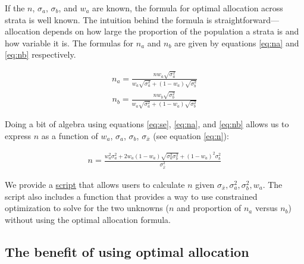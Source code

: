 \documentclass[12pt, letterpaper]{article}
\begin{document}
If the $n$, $\sigma_a$, $\sigma_b$, and $w_a$ are known, the formula for optimal allocation across strata is well known. The intuition behind the formula is straightforward---allocation depends on how large the proportion of the population a strata is and how variable it is. The formulas for $n_a$ and $n_b$ are given by equations \ref{eq:na} and \ref{eq:nb} respectively.

\begin{align}\label{eq:na}
n_a = \frac{n w_a \sqrt{\sigma_a^2}}{w_a \sqrt{\sigma_a^2} + (1 - w_a) \sqrt{\sigma_b^2}}
\end{align}
\begin{align}\label{eq:nb}
n_b = \frac{n w_b \sqrt{\sigma_b^2}}{w_a \sqrt{\sigma_a^2} + (1 - w_a) \sqrt{\sigma_b^2}}
\end{align}

Doing a bit of algebra using equations \ref{eq:se}, \ref{eq:na}, and \ref{eq:nb} allows us to express $n$ as a function of $w_a$, $\sigma_a$, $\sigma_b$, $\sigma_{\bar{x}}$ (see equation \ref{eq:n}):

\begin{align}\label{eq:n}
n  = \frac{w_a^2 \sigma_a^2 + 2 w_a (1 - w_a) \sqrt{\sigma_a^2 \sigma_b^2} + (1 - w_a)^2 \sigma_b^2}{\sigma_{\bar{x}}^2}
\end{align}\label{eq:n}

We provide a \href{https://github.com/soodoku/optimal\_data\_collection/blob/main/scripts/smallest\_n\_for\_se.R}{script} that allows users to calculate $n$ given $\sigma_{\bar{x}}, \sigma_a^2, \sigma_b^2, w_a$. The script also includes a function that provides a way to use constrained optimization to solve for the two unknowns ($n$ and proportion of $n_a$ versus $n_b$) without using the optimal allocation formula.

\subsection*{The benefit of using optimal allocation}
\end{document}
